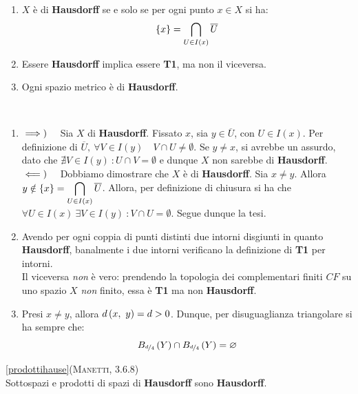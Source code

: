 \begin{observe}~{}
	\begin{enumerate}
		\item $X$ è di \textbf{Hausdorff} se e solo se per ogni punto $x\in X$ si ha:
		\begin{equation}
			\left\{x\right\}=\inter_{U\in I\left(x\right)}\overline{U}
		\end{equation}
		\item Essere \textbf{Hausdorff} implica essere \textbf{T1}, ma non il viceversa.
		\item Ogni spazio metrico è di \textbf{Hausdorff}.
	\end{enumerate}
\end{observe}
\begin{demonstration}~{}
	\begin{enumerate}[label=\Roman*]
		\item $\impliesdx$ Sia $X$ di \textbf{Hausdorff}. Fissato $x$, sia $y\in\overline{U}$, con $U\in I\left(x\right)$. Per definizione di $\overline{U},\ \forall V\in I\left(y\right)\quad V\cap U\neq\emptyset$. Se $y \neq x$, si avrebbe un assurdo, dato che $\nexists V\in I\left(y\right)\ \colon U\cap V=\emptyset$ e dunque $X$ non sarebbe di \textbf{Hausdorff}.\\
		$\impliessx$ Dobbiamo dimostrare che $X$ è di \textbf{Hausdorff}. Sia $x\neq y$. Allora $\displaystyle y\notin\left\{x\right\}=\inter_{U\in I\left(x\right)}\overline{U}$. Allora, per definizione di chiusura si ha che $\forall U\in I\left(x\right)\ \exists V\in I\left(y\right)\ \colon V\cap U=\emptyset$. Segue dunque la tesi.
		\item Avendo per ogni coppia di punti distinti due intorni disgiunti in quanto \textbf{Hausdorff}, banalmente i due intorni verificano la definizione di \textbf{T1} per intorni.\\
		Il viceversa \textit{non} è vero: prendendo la topologia dei complementari finiti $CF$ su uno spazio $X$ \textit{non} finito, essa è \textbf{T1} ma non \textbf{Hausdorff}.
		\item Presi $x\neq y$, allora $\mvf{d}{x}{y}=d>0$. Dunque, per disuguaglianza triangolare si ha sempre che:
		\begin{equation*}
			B_{\nicefrac{d}{4}}\left(Y\right)\cap B_{\nicefrac{d}{4}}\left(Y\right)=\emptyset
		\end{equation*}
	\end{enumerate}
\end{demonstration}
\begin{proposition}\ref{prodottihause}\textsc{(Manetti, 3.6.8)}\\
	Sottospazi e prodotti di spazi di \textbf{Hausdorff} sono \textbf{Hausdorff}.
\end{proposition}
